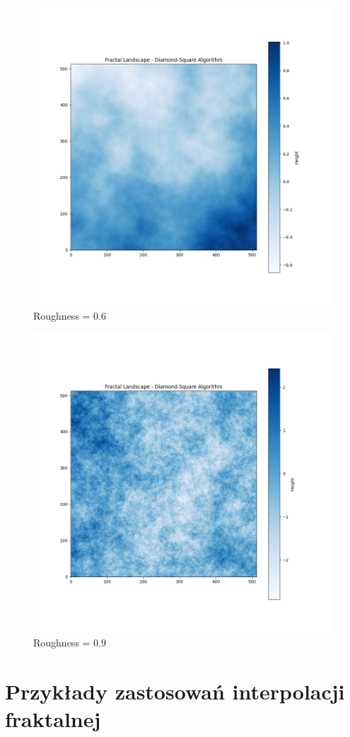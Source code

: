 \documentclass{article}
\begin{document}
\begin{figure}[H]
    \centering
    \includegraphics[width=0.7\linewidth]{Blues_9_0.6.png}
    \caption{Roughness = 0.6}
\end{figure}

\begin{figure}[H]
    \centering
    \includegraphics[width=0.7\linewidth]{Blues_9_0.9.png}
    \caption{Roughness = 0.9}
\end{figure}

\vspace{1cm}

\section{Przykłady zastosowań interpolacji fraktalnej}
\end{document}
